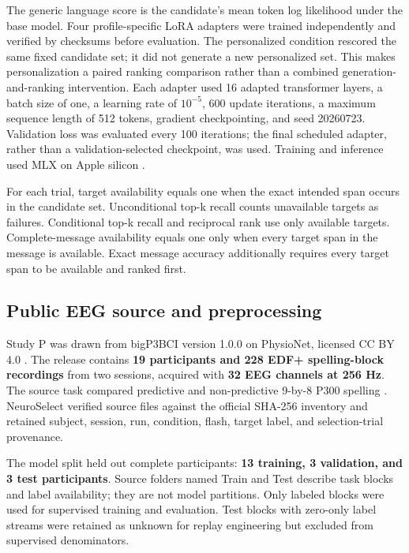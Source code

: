 \documentclass[11pt]{article}
\begin{document}
The generic language score is the candidate's mean token log likelihood under the base model. Four profile-specific LoRA adapters were trained independently and verified by checksums before evaluation. The personalized condition rescored the same fixed candidate set; it did not generate a new personalized set. This makes personalization a paired ranking comparison rather than a combined generation-and-ranking intervention. Each adapter used 16 adapted transformer layers, a batch size of one, a learning rate of $10^{-5}$, 600 update iterations, a maximum sequence length of 512 tokens, gradient checkpointing, and seed 20260723. Validation loss was evaluated every 100 iterations; the final scheduled adapter, rather than a validation-selected checkpoint, was used. Training and inference used MLX on Apple silicon \cite{hannun2023}.


For each trial, target availability equals one when the exact intended span occurs in the candidate set. Unconditional top-k recall counts unavailable targets as failures. Conditional top-k recall and reciprocal rank use only available targets. Complete-message availability equals one only when every target span in the message is available. Exact message accuracy additionally requires every target span to be available and ranked first.


\subsection{Public EEG source and preprocessing}

Study P was drawn from bigP3BCI version 1.0.0 on PhysioNet, licensed CC BY 4.0 \cite{mainsah2025}. The release contains \textbf{19 participants and 228 EDF+ spelling-block recordings} from two sessions, acquired with \textbf{32 EEG channels at 256 Hz}. The source task compared predictive and non-predictive 9-by-8 P300 spelling \cite{ryan2011}. NeuroSelect verified source files against the official SHA-256 inventory and retained subject, session, run, condition, flash, target label, and selection-trial provenance.


The model split held out complete participants: \textbf{13 training, 3 validation, and 3 test participants}. Source folders named Train and Test describe task blocks and label availability; they are not model partitions. Only labeled blocks were used for supervised training and evaluation. Test blocks with zero-only label streams were retained as unknown for replay engineering but excluded from supervised denominators.
\end{document}
